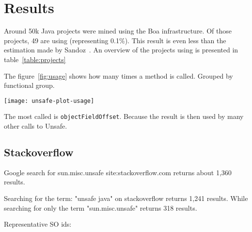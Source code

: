 
\section{Results} \label{sec:results}


Around 50k Java projects were mined using the Boa infrastructure.
Of those projects, 49 are using \smu{} (representing 0.1\%).
This result is even less than the estimation made by Sandoz~\cite{psandoz14}.
An overview of the projects using \smu{} is presented in table~\ref{table:projects}




The figure~\ref{fig:usage} shows how many times a method is called. Grouped by functional group.

\begin{figure*}[htb]
\texttt{[image: unsafe-plot-usage]}
\caption{sun.misc.Unsafe methods usage} \label{fig:usage}
\end{figure*}

The most called is \texttt{objectFieldOffset}. Because the result is then used by many other calls to Unsafe.

\subsection{Stackoverflow}

Google search for sun.misc.unsafe site:stackoverflow.com
returns about 1,360 results.

Searching for the term: "unsafe java" on stackoverflow returns 1,241 results.
While searching for only the term "sun.misc.unsafe" returns 318 results.

Representative SO ids:




